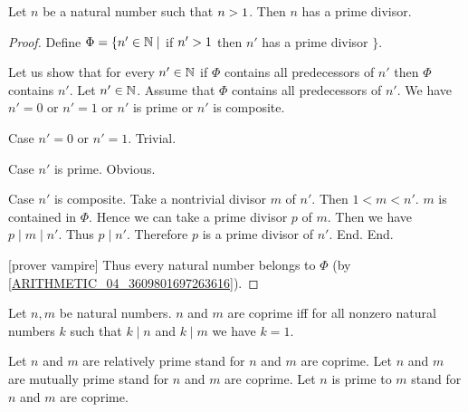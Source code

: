 \documentclass[../arithmetic.tex]{subfiles}
\begin{document}
  \begin{forthel}
    \begin{proposition}
      Let $n$ be a natural number such that $n > 1$.
      Then $n$ has a prime divisor.
    \end{proposition}
    \begin{proof}
      Define $\Phi = \{ n' \in \mathbb{N} \mid$ if $n' > 1$ then $n'$ has a prime
      divisor $\}$.

      Let us show that for every $n' \in \mathbb{N}$ if $\Phi$ contains all
      predecessors of $n'$ then $\Phi$ contains $n'$.
        Let $n' \in \mathbb{N}$.
        Assume that $\Phi$ contains all predecessors of $n'$.
        We have $n' = 0$ or $n' = 1$ or $n'$ is prime or $n'$ is composite.

        Case $n' = 0$ or $n' = 1$. Trivial.

        Case $n'$ is prime. Obvious.

        Case $n'$ is composite.
          Take a nontrivial divisor $m$ of $n'$.
          Then $1 \less m \less n'$.
          $m$ is contained in $\Phi$.
          Hence we can take a prime divisor $p$ of $m$.
          Then we have $p \mid m \mid n'$.
          Thus $p \mid n'$.
          Therefore $p$ is a prime divisor of $n'$.
        End.
      End.

      [prover vampire]
      Thus every natural number belongs to $\Phi$
      (by \cref{ARITHMETIC_04_3609801697263616}).
    \end{proof}
  \end{forthel}

  \begin{forthel}
    \begin{definition}
      Let $n, m$ be natural numbers.
      $n$ and $m$ are coprime iff for all nonzero natural numbers $k$ such that
      $k \mid n$ and $k \mid m$ we have $k = 1$.
    \end{definition}

    Let $n$ and $m$ are relatively prime stand for $n$ and $m$ are coprime.
    Let $n$ and $m$ are mutually prime stand for $n$ and $m$ are coprime.
    Let $n$ is prime to $m$ stand for $n$ and $m$ are coprime.
  \end{forthel}
\end{document}
